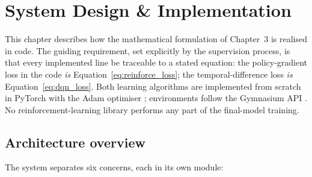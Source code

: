 \chapter{System Design \& Implementation}
\label{ch:implementation}

This chapter describes how the mathematical formulation of Chapter~3 is
realised in code. The guiding requirement, set explicitly by the
supervision process, is that every implemented line be traceable to a
stated equation: the policy-gradient loss in the code \emph{is}
Equation~\ref{eq:reinforce_loss}; the temporal-difference loss
\emph{is} Equation~\ref{eq:dqn_loss}. Both learning algorithms are
implemented from scratch in PyTorch \cite{paszke2019} with the Adam
optimiser \cite{kingma2015adam}; environments follow the Gymnasium API
\cite{brockman2016gym, towers2024gymnasium}. No reinforcement-learning
library performs any part of the final-model training.

\section{Architecture overview}
\label{sec:arch}

The system separates six concerns, each in its own module:

